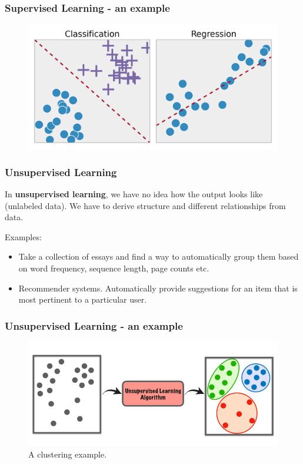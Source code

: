 \documentclass{beamer}
\begin{document}
	\begin{frame}
		\frametitle{Supervised Learning - an example}
		\begin{figure}
			\centering
			\includegraphics[scale=0.22]{images/supervised-learning}
		\end{figure}
	\end{frame}

	\begin{frame}
		\frametitle{Unsupervised Learning}
		In \textbf{unsupervised learning}, we have no idea how the output looks like (unlabeled data). We have to derive structure and different relationships from data.
		
		Examples:
		\begin{itemize}
			\item Take a collection of essays and find a way to automatically group them based on word frequency, sequence length, page counts etc.
			\item Recommender systems. Automatically provide suggestions for an item
			that is most pertinent to a particular user.
		\end{itemize} 
		
	\end{frame}

	\begin{frame}
		\frametitle{Unsupervised Learning - an example}
		\begin{figure}
			\centering
			\includegraphics[scale=0.35]{images/unsupervised-learning}
			\caption{A clustering example.}
		\end{figure}
	\end{frame}
	
\end{document}
